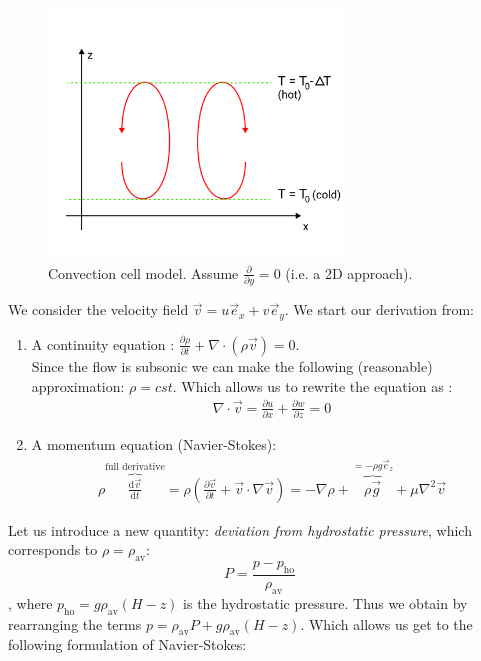 \begin{figure}[h!]
    \centering
    \includegraphics[width=0.7\textwidth]{figures/1_convection_cell.png}
    \caption{Convection cell model. Assume $\frac{\partial}{\partial y} = 0$ (i.e. a 2D approach).}
\end{figure}

We consider the velocity field $\vec{v} = u \vec{e}_x + v \vec{e}_y$. We start our derivation from:

\begin{enumerate}
    \item A continuity equation : $\frac{\partial \rho}{\partial t} + \nabla \cdot (\rho \vec{v}) = 0$. \\
    Since the flow is subsonic we can make the following (reasonable) approximation: $\rho = cst $. Which allows us to rewrite the equation as : 
    \begin{align}
        \nabla \cdot\vec{v} = \frac{\partial u}{ \partial x} + \frac{\partial w}{ \partial z} = 0  \tag{1}
    \end{align}
    \item A momentum equation (Navier-Stokes):\\
    \begin{align*}
        \rho\overbrace{\frac{\mathrm{d} \vec{v}}{\mathrm{d} t}}^\text{full derivative}
        = \rho \left( 
            \frac{\partial \vec{v}}{\partial t} + \vec{v}\cdot\nabla \vec{v} \right) 
        = - \nabla \rho + \overbrace{\rho \vec{g}}^{= - \rho g \vec{e}_z} + \mu \nabla^2 \vec{v} 
    \end{align*}
\end{enumerate}

Let us introduce a new quantity: \textit{deviation from hydrostatic pressure}, which corresponds to $\rho = \rho_\text{av}$:
 \[P = \frac{p - p_\text{ho}}{\rho_\text{av}}\]
, where $p_\text{ho}  = g \rho_\text{av} (H-z)$ is the hydrostatic pressure. Thus we obtain by rearranging the terms $p = \rho_\text{av}P + g \rho_\text{av}(H-z)$. Which allows us get to the following formulation of Navier-Stokes: 

